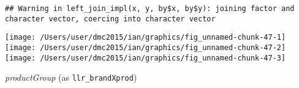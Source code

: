 \documentclass[10pt]{report}
\newenvironment{Shaded}{}{}
\newcommand{\KeywordTok}[1]{\textcolor[rgb]{0.00,0.44,0.13}{\textbf{{#1}}}}
\newcommand{\DataTypeTok}[1]{\textcolor[rgb]{0.56,0.13,0.00}{{#1}}}
\newcommand{\StringTok}[1]{\textcolor[rgb]{0.25,0.44,0.63}{{#1}}}
\newcommand{\NormalTok}[1]{{#1}}
\begin{document}
\begin{Shaded}
\end{Shaded}

\begin{verbatim}
## Warning in left_join_impl(x, y, by$x, by$y): joining factor and character vector, coercing into character vector
\end{verbatim}

\begin{Shaded}
\end{Shaded}

\begin{center}\texttt{[image: /Users/user/dmc2015/ian/graphics/fig\_unnamed-chunk-47-1]} \texttt{[image: /Users/user/dmc2015/ian/graphics/fig\_unnamed-chunk-47-2]} \texttt{[image: /Users/user/dmc2015/ian/graphics/fig\_unnamed-chunk-47-3]} \end{center}

\emph{productGroup} (as \texttt{llr\_brandXprod})
\end{document}
